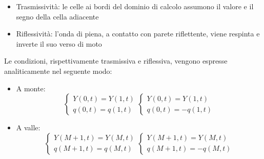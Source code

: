 \documentclass[12pt]{article} %
\begin{document}
\begin{itemize}
\item Trasmissività: le celle ai bordi del dominio di calcolo assumono il valore e il segno della cella adiacente
\item Riflessività: l’onda di piena, a contatto con parete riflettente, viene respinta e inverte il suo verso di moto
\end{itemize}

\noindent Le condizioni, rispettivamente trasmissiva e riflessiva, vengono espresse analiticamente nel seguente modo:
\begin{itemize}
\item A monte: 
\begin{equation}
\begin{cases}
    Y(0,t)=Y(1,t)\\
    q(0,t)=q(1,t)
    \end{cases}
    \begin{cases}
    Y(0,t)=Y(1,t)\\
    q(0,t)=-q(1,t)
    \end{cases}
\end{equation}
\item A valle:
\begin{equation}
\begin{cases}
    Y(M+1,t)=Y(M,t)\\
    q(M+1,t)=q(M,t)
    \end{cases}
    \begin{cases}
    Y(M+1,t)=Y(M,t)\\
    q(M+1,t)=-q(M,t)
    \end{cases}
\end{equation}
\end{itemize}
\end{document}
